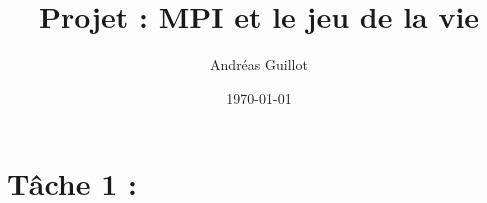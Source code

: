 \documentclass{article}
\title{Projet : MPI et le jeu de la vie}
\author{Andréas Guillot}
\date{\today}
\begin{document}
\maketitle

\section{Tâche 1 :}
\end{document}
